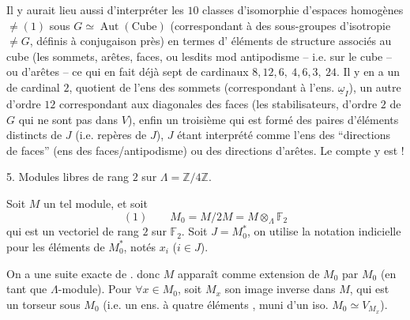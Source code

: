 Il y aurait lieu aussi d'interpréter les $10$ classes d'isomorphie d'espaces homogènes $\ne(1)$ sous $G\simeq\operatorname{Aut}(\text{Cube})$ (correspondant à des  sous-groupes d'isotropie $\ne G$, définis à conjugaison près) en termes d' éléments de structure associés au cube (les sommets, arêtes, faces, ou lesdits mod antipodisme -- i.e. sur le cube  -- ou  d'arêtes -- ce qui en fait déjà sept  de cardinaux $8,12,6,\ 4,6,3,\ 24$.
Il y en a un de cardinal $2$, quotient de l'ens des sommets (correspondant à l'ens. $\underline{\omega}_I$), un autre d'ordre $12$ correspondant aux diagonales des faces  (les stabilisateurs,  d'ordre $2$ de $G$ qui ne sont pas dans $V$), enfin un troisième qui est formé des paires d'éléments distincts de $J$ (i.e. repères de $J$), $J$ étant interprété comme l'ens des ``directions de faces'' \deleted{\unsure{(=}} (ens des faces/antipodisme) ou des directions d'arêtes. Le compte y est !

5. Modules libres de rang $2$ sur $\Lambda=\mathbb{Z}/4\mathbb{Z}$.

Soit $M$ un tel module, et soit
\[
(1)\qquad M_0=M/2M=M\otimes_\Lambda\mathbb{F}_2
\]
qui est un vectoriel de rang $2$ sur $\mathbb{F}_2$. Soit $J=M_0^*$, on utilise la notation indicielle pour les éléments de $M_0^*$, notés $x_i$ ($i\in J$). 

On a une suite exacte de .
donc $M$ apparaît comme extension de $M_0$ par $M_0$ (en tant que $\Lambda$-module). Pour $\forall x\in M_0$, soit $M_x$ son image inverse dans $M$, qui est un torseur sous $M_0$ (i.e. un ens. à quatre éléments , muni d'un iso. $M_0\simeq V_{M_x}$).

